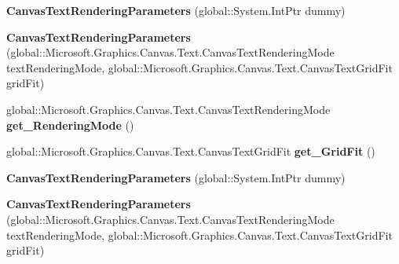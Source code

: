 \begin{DoxyCompactItemize}
\item 
\mbox{\label{class_microsoft_1_1_graphics_1_1_canvas_1_1_text_1_1_canvas_text_rendering_parameters_a808dd2cd44ae8871c788d0f285abb379}} 
{\bfseries Canvas\+Text\+Rendering\+Parameters} (global\+::\+System.\+Int\+Ptr dummy)
\item 
\mbox{\label{class_microsoft_1_1_graphics_1_1_canvas_1_1_text_1_1_canvas_text_rendering_parameters_a8bc601f6cb5eb616c046828f90971b95}} 
{\bfseries Canvas\+Text\+Rendering\+Parameters} (global\+::\+Microsoft.\+Graphics.\+Canvas.\+Text.\+Canvas\+Text\+Rendering\+Mode text\+Rendering\+Mode, global\+::\+Microsoft.\+Graphics.\+Canvas.\+Text.\+Canvas\+Text\+Grid\+Fit grid\+Fit)
\item 
\mbox{\label{class_microsoft_1_1_graphics_1_1_canvas_1_1_text_1_1_canvas_text_rendering_parameters_ac81e7f0df5d66bcb7ea9834f1b82dbfe}} 
global\+::\+Microsoft.\+Graphics.\+Canvas.\+Text.\+Canvas\+Text\+Rendering\+Mode {\bfseries get\+\_\+\+Rendering\+Mode} ()
\item 
\mbox{\label{class_microsoft_1_1_graphics_1_1_canvas_1_1_text_1_1_canvas_text_rendering_parameters_aa1458117209938acb439e48a1b9840d1}} 
global\+::\+Microsoft.\+Graphics.\+Canvas.\+Text.\+Canvas\+Text\+Grid\+Fit {\bfseries get\+\_\+\+Grid\+Fit} ()
\item 
\mbox{\label{class_microsoft_1_1_graphics_1_1_canvas_1_1_text_1_1_canvas_text_rendering_parameters_a808dd2cd44ae8871c788d0f285abb379}} 
{\bfseries Canvas\+Text\+Rendering\+Parameters} (global\+::\+System.\+Int\+Ptr dummy)
\item 
\mbox{\label{class_microsoft_1_1_graphics_1_1_canvas_1_1_text_1_1_canvas_text_rendering_parameters_a8bc601f6cb5eb616c046828f90971b95}} 
{\bfseries Canvas\+Text\+Rendering\+Parameters} (global\+::\+Microsoft.\+Graphics.\+Canvas.\+Text.\+Canvas\+Text\+Rendering\+Mode text\+Rendering\+Mode, global\+::\+Microsoft.\+Graphics.\+Canvas.\+Text.\+Canvas\+Text\+Grid\+Fit grid\+Fit)

\end{DoxyCompactItemize}
